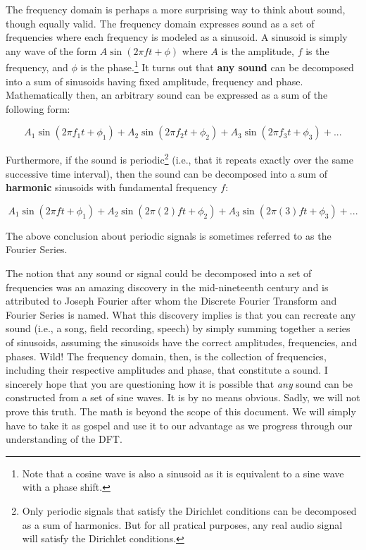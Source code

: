 The frequency domain is perhaps a more surprising way to think about sound, though equally valid.  The
frequency domain expresses sound as a set of frequencies where each frequency is modeled as a sinusoid.  
A sinusoid is simply any wave of the form $ A\sin(2\pi f t + \phi)$ where $A$ is the amplitude, $f$ is the 
frequency, and $\phi$ is the phase.\footnote{Note that a 
	cosine wave is also a 
	sinusoid as it is equivalent to a sine wave with a phase shift.
}  It turns out that \textbf{any sound} can be 
decomposed into a sum of sinusoids having fixed amplitude, frequency and phase.  Mathematically then, an
arbitrary sound can be expressed as a sum of the following form:

$$A_1\sin(2\pi f_1 t + \phi_1) + A_2\sin(2 \pi f_2 t + \phi_2) + A_3\sin(2 \pi f_3 t + \phi_3) + ...$$

\noindent Furthermore, if the sound is periodic\footnote{
	Only periodic signals that satisfy the Dirichlet conditions can be decomposed as a sum of harmonics.  
	But for all pratical purposes, any real audio signal will satisfy the Dirichlet conditions.
}  (i.e., that it repeats exactly over the same successive time interval), then 
the sound can be decomposed into a sum of \textbf{harmonic} sinusoids with fundamental frequency $f$:

$$A_1\sin(2\pi f t + \phi_1) + A_2\sin(2 \pi (2)f t + \phi_2) + A_3\sin(2 \pi (3)f t + \phi_3) + ...$$

\noindent  The above conclusion about periodic signals is sometimes referred to as the Fourier Series.

The notion that any sound or signal could be decomposed into a set of frequencies was an amazing 
discovery in the mid-nineteenth century and is attributed to Joseph Fourier after whom the
Discrete Fourier Transform and Fourier Series is named.  What this discovery implies is that you can recreate 
any sound (i.e., a song, 
field recording, speech) by simply summing together a series of sinusoids, assuming the sinusoids have the correct 
amplitudes, frequencies, and phases.  Wild!  The frequency domain, then, is the collection of frequencies, including
their respective amplitudes and phase,
that constitute a sound.   I sincerely hope that you are questioning how it is possible that \textit{any} sound can be
constructed from a set of sine waves.  It is by no means obvious.  Sadly, we will not prove this truth.  
The math is beyond the scope of this document.  We will simply have to take it as gospel and use it to our 
advantage as we progress through our understanding of the DFT.

